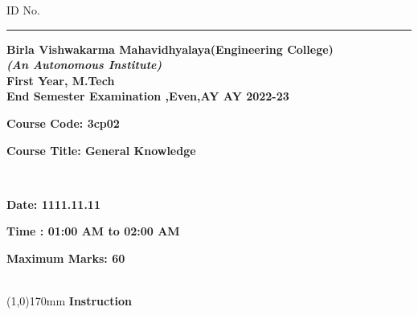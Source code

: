 \documentclass[addpoints,12pt]{exam}
\begin{document}
      \hspace{-7mm}ID No.\rule{20mm}{0.3mm}
      \begin{center}
   \textbf{Birla Vishwakarma Mahavidhyalaya(Engineering College)} \\
    \textbf{\textit{(An Autonomous Institute)}} \\
    \textbf{First Year, M.Tech} \\
    \textbf{End Semester Examination ,Even,AY AY 2022-23} \\
    \vspace{4mm}
   
   
    \end{center}
   
    \hspace{-7mm}
    \parbox[t]{50mm}{\textbf{Course Code: 3cp02}}
    \parbox[t]{100mm}{\textbf{Course Title: General Knowledge}}\vspace{2mm}\\
    \parbox[t]{50mm}{\textbf{Date: 1111.11.11}}
    \parbox[t]{75mm}{\textbf{Time : 01:00 AM to 02:00 AM}}
    \parbox[t]{50mm}{\textbf{Maximum Marks: 60}}\\
    \line(1,0){170mm} \vspace{2mm}
    \hspace{-6mm}\textbf{Instruction}
  
   
  
\end{document}
